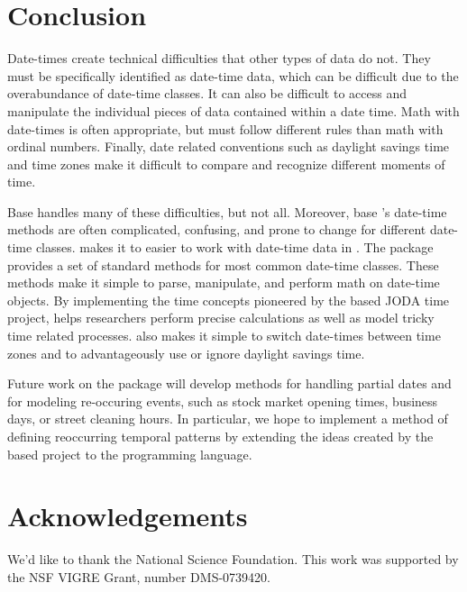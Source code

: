 \documentclass[article]{jss}
\begin{document}
\section{Conclusion}
Date-times create technical difficulties that other types of data do not. They must be specifically identified as date-time data, which can be difficult due to the overabundance of date-time classes. It can also be difficult to access and manipulate the individual pieces of data contained within a date time. Math with date-times is often appropriate, but must follow different rules than math with ordinal numbers. Finally, date related conventions such as daylight savings time and time zones make it difficult to compare and recognize different moments of time.

Base  handles many of these difficulties, but not all. Moreover, base 's date-time methods are often complicated, confusing, and prone to change for different date-time classes.  makes it to easier to work with date-time data in . The package provides a set of standard methods for most common date-time classes. These methods make it simple to parse, manipulate, and perform math on date-time objects. By implementing the time concepts pioneered by the  based JODA time project,  helps researchers perform precise calculations as well as model tricky time related processes.  also makes it simple to switch date-times between time zones and to advantageously use or ignore daylight savings time.

Future work on the  package will develop methods for handling partial dates and for modeling re-occuring events, such as stock market opening times, business days, or street cleaning hours. In particular, we hope to implement a method of defining reoccurring temporal patterns by extending the ideas created by the  based  project \citep{runts} to the  programming language.

\section*{Acknowledgements}
We'd like to thank the National Science Foundation. This work was supported by the NSF VIGRE Grant, number  DMS-0739420.



\end{document}
